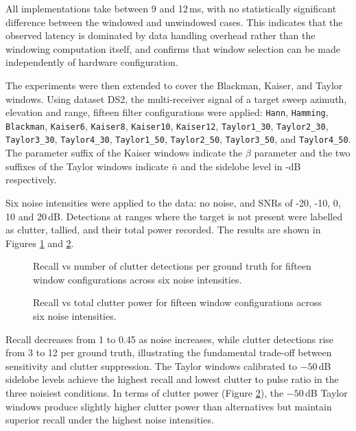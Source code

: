 All implementations take between 9 and 12\,ms, with no statistically significant
difference between the windowed and unwindowed cases. This indicates that the observed
latency is dominated by data handling overhead rather than the windowing computation
itself, and confirms that window selection can be made independently of hardware
configuration.

The experiments were then extended to cover the Blackman, Kaiser, and Taylor windows. 
Using dataset DS2,
the multi-receiver signal of a target sweep azimuth, elevation and range, 
fifteen filter configurations were applied: \texttt{Hann}, \texttt{Hamming},
\texttt{Blackman}, \texttt{Kaiser6}, \texttt{Kaiser8}, \texttt{Kaiser10},
\texttt{Kaiser12}, \texttt{Taylor1\_30}, \texttt{Taylor2\_30},
\texttt{Taylor3\_30}, \texttt{Taylor4\_30}, \texttt{Taylor1\_50},
\texttt{Taylor2\_50}, \texttt{Taylor3\_50}, and \texttt{Taylor4\_50}.
The parameter suffix of the Kaiser windows indicate the
\(\beta\) parameter and the two suffixes of the Taylor windows indicate \(\bar{n}\) and the
sidelobe level in -dB respectively.

Six noise intensities were applied to the data: no noise, and SNRs of -20, -10,
0, 10 and 20\,dB. Detections at ranges where the target is not present were labelled as
clutter, tallied, and their total power recorded. The results are shown in Figures
\ref{fig:recall_vs_clutter} and \ref{fig:recall_vs_clutter_power}.

\begin{figure}
    \caption[Recall vs clutter for different window functions.]{Recall vs number of clutter
    detections per ground truth for fifteen window configurations across six noise
    intensities.}
    \label{fig:recall_vs_clutter}
\end{figure}

\begin{figure}
    \caption[Recall vs clutter power for different window functions.]{Recall vs total clutter
    power for fifteen window configurations across six noise intensities.}
    \label{fig:recall_vs_clutter_power}
\end{figure}

Recall decreases from 1 to 0.45 as noise increases, while clutter detections rise from 3
to 12 per ground truth, illustrating the fundamental trade-off between sensitivity and
clutter suppression. The Taylor windows calibrated to $-50$\,dB sidelobe levels achieve
the highest recall and lowest clutter to pulse ratio in the three noisiest conditions. 
In terms of clutter power (Figure \ref{fig:recall_vs_clutter_power}),
the $-50$\,dB Taylor windows produce slightly higher clutter power than alternatives but
maintain superior recall under the highest noise intensities.

